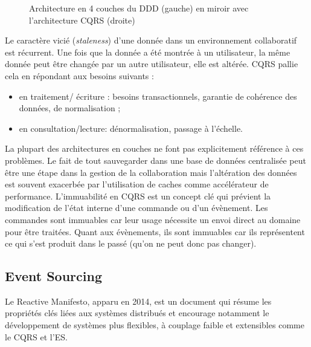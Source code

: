 \begin{figure}[ht]
	\noindent
	\centering
	\caption{Architecture en 4 couches du DDD (gauche) en miroir avec 
		l'architecture CQRS 
		(droite)}
	\label{fig:dddcqrs}
\end{figure}



Le caractère vicié (\textit{staleness}) d'une donnée dans un environnement 
collaboratif est récurrent. Une fois que la donnée a été montrée à un utilisateur, la 
même donnée peut être changée par un autre utilisateur, elle est altérée. 
\gls{CQRS} pallie cela en répondant aux besoins suivants :
\begin{itemize}
	\item en traitement/ écriture : besoins transactionnels, garantie de cohérence 
	des données, de normalisation ;
	\item en consultation/lecture: dénormalisation, passage à l'échelle.
\end{itemize}

La plupart des architectures en couches ne font pas explicitement référence à ces 
problèmes. Le fait de tout sauvegarder dans une base de données centralisée peut 
être une étape dans la gestion de la collaboration mais l'altération des données est 
souvent exacerbée par l'utilisation de caches comme accélérateur de performance.
L'immuabilité en \gls{CQRS} est un concept clé qui prévient la  
modification de l'état interne d'une commande ou d'un évènement. Les 
commandes sont immuables car leur usage nécessite un envoi direct au domaine 
pour être traitées. Quant aux évènements, ils sont immuables car ils représentent 
ce qui s'est produit dans le passé (qu'on ne peut donc pas changer). 

\subsection{Event Sourcing}
\label{sec:es}

Le Reactive Manifesto, apparu en 2014, est un document qui résume les 
propriétés clés liées aux systèmes distribués et encourage notamment le 
développement de systèmes \og plus flexibles, à couplage faible et 
extensibles\fg{}\cite{Boner2014TheManifesto} comme le \gls{CQRS} et l'\gls{ES}.

